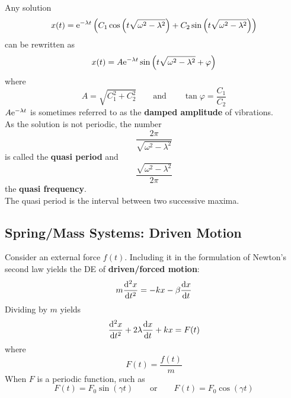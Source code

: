 \documentclass[./Differential Equations.tex]{subfiles}
\begin{document}
				Any solution
					\[x(t) = \text{e}^{-\lambda t}\left(C_1\cos\left(t\sqrt{\omega^2 - \lambda^2}\right) + C_2\sin\left(t\sqrt{\omega^2 - \lambda^2}\right)\right)\]
					can be rewritten as
					\[x(t) = A\text{e}^{-\lambda t}\sin\left(t\sqrt{\omega^2 - \lambda^2} + \varphi\right)\]
					where
					\[
						A = \sqrt{C_1^2 + C_2^2} \qquad \text{and} \qquad
						\tan\varphi = \frac{C_1}{C_2}
					\]
					\(A\text{e}^{-\lambda t}\) is sometimes referred to as the \textbf{damped amplitude} of vibrations. \\
				As the solution is not periodic, the number
					\[\frac{2\pi}{\sqrt{\omega^2 - \lambda^2}}\]	
					is called the \textbf{quasi period} and
					\[\frac{\sqrt{\omega^2 - \lambda^2}}{2\pi}\]
					the \textbf{quasi frequency}. \\
					The quasi period is the interval between two successive maxima.
		\subsection{Spring/Mass Systems: Driven Motion}
				Consider an external force \(f(t)\). Including it in the formulation of Newton's second law yields the DE of \textbf{driven/forced motion}:
					\[m\dv[2]{x}{t} = -kx - \beta\dv{x}{t}\]
					Dividing by \(m\) yields
					\[\dv[2]{x}{t} + 2\lambda\dv{x}{t} + kx = F(t)\]
					where 
					\[F(t) = \frac{f(t)}{m}\]
				When \(F\) is a periodic function, such as
					\[F(t) = F_0\sin(\gamma t) \qquad \text{or} \qquad F(t) = F_0\cos(\gamma t)\]
\end{document}
